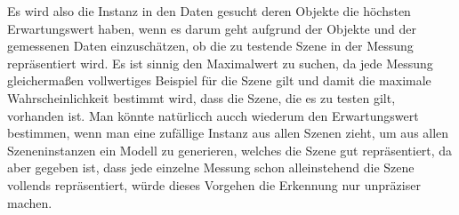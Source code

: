 Es wird also die Instanz in den Daten gesucht deren Objekte die höchsten Erwartungswert haben, wenn es darum geht aufgrund der Objekte und der gemessenen Daten einzuschätzen, ob die zu testende Szene in der Messung repräsentiert wird. Es ist sinnig den Maximalwert zu suchen, da jede Messung gleichermaßen vollwertiges Beispiel für die Szene gilt und damit die maximale Wahrscheinlichkeit bestimmt wird, dass die Szene, die es zu testen gilt, vorhanden ist. Man könnte natürlicch aucch wiederum den Erwartungswert bestimmen, wenn man eine zufällige Instanz aus allen Szenen zieht, um aus allen Szeneninstanzen ein Modell zu generieren, welches die Szene gut repräsentiert, da aber gegeben ist, dass jede einzelne Messung schon alleinstehend die Szene vollends repräsentiert, würde dieses Vorgehen die Erkennung nur unpräziser machen.




